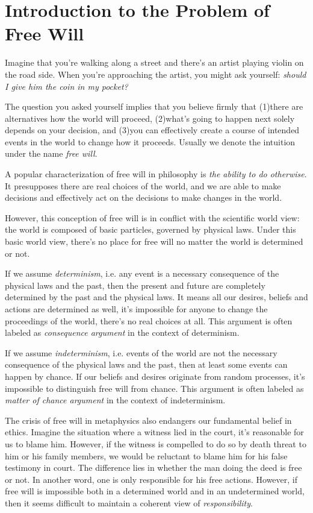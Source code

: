 \section{Introduction to the Problem of Free Will}

Imagine that you're walking along a street and there's an artist playing violin on the road side. When you're approaching the artist, you might ask yourself: \emph{should I give him the coin in my pocket?}

The question you asked yourself implies that you believe firmly that (1)there are alternatives how the world will proceed, (2)what's going to happen next solely depends on your decision, and (3)you can effectively create a course of intended events in the world to change how it proceeds. Usually we denote the intuition under the name \emph{free will}.

A popular characterization of free will in philosophy is \emph{the ability to do otherwise}. It presupposes there are real choices of the world, and we are able to make decisions and effectively act on the decisions to make changes in the world.

However, this conception of free will is in conflict with the scientific world view: the world is composed of basic particles, governed by physical laws. Under this basic world view, there’s no place for free will no matter the world is determined or not.

If we assume \emph{determinism}, i.e. any event is a necessary consequence of the physical laws and the past, then the present and future are completely determined by the past and the physical laws. It means all our desires, beliefs and actions are determined as well, it’s impossible for anyone to change the proceedings of the world, there’s no real choices at all. This argument is often labeled as \emph{consequence argument} in the context of determinism.

If we assume \emph{indeterminism}, i.e. events of the world are not the necessary consequence of the physical laws and the past, then at least some events can happen by chance. If our beliefs and desires originate from random processes, it’s impossible to distinguish free will from chance. This argument is often labeled as \emph{matter of chance argument} in the context of indeterminism.

The crisis of free will in metaphysics also endangers our fundamental belief in ethics. Imagine the situation where a witness lied in the court, it's reasonable for us to blame him. However, if the witness is compelled to do so by death threat to him or his family members, we would be reluctant to blame him for his false testimony in court. The difference lies in whether the man doing the deed is free or not. In another word, one is only responsible for his free actions. However, if free will is impossible both in a determined world and in an undetermined world, then it seems difficult to maintain a coherent view of \emph{responsibility}.

